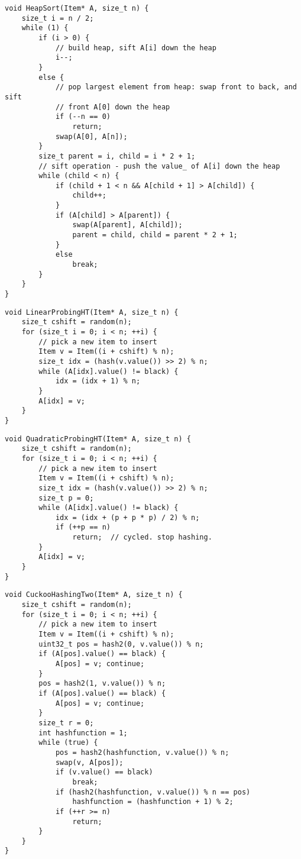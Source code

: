 \documentclass[a4paper,landscape,12pt,twoside,english]{scrartcl}
\begin{document}
\clearpage
\fontsize{15}{16}\selectfont
\begin{verbatim}
void HeapSort(Item* A, size_t n) {
    size_t i = n / 2;
    while (1) {
        if (i > 0) {
            // build heap, sift A[i] down the heap
            i--;
        }
        else {
            // pop largest element from heap: swap front to back, and sift
            // front A[0] down the heap
            if (--n == 0)
                return;
            swap(A[0], A[n]);
        }
        size_t parent = i, child = i * 2 + 1;
        // sift operation - push the value_ of A[i] down the heap
        while (child < n) {
            if (child + 1 < n && A[child + 1] > A[child]) {
                child++;
            }
            if (A[child] > A[parent]) {
                swap(A[parent], A[child]);
                parent = child, child = parent * 2 + 1;
            }
            else
                break;
        }
    }
}
\end{verbatim}

\clearpage
\fontsize{16}{17.5}\selectfont
\begin{verbatim}
void LinearProbingHT(Item* A, size_t n) {
    size_t cshift = random(n);
    for (size_t i = 0; i < n; ++i) {
        // pick a new item to insert
        Item v = Item((i + cshift) % n);
        size_t idx = (hash(v.value()) >> 2) % n;
        while (A[idx].value() != black) {
            idx = (idx + 1) % n;
        }
        A[idx] = v;
    }
}
\end{verbatim}
\begin{verbatim}
void QuadraticProbingHT(Item* A, size_t n) {
    size_t cshift = random(n);
    for (size_t i = 0; i < n; ++i) {
        // pick a new item to insert
        Item v = Item((i + cshift) % n);
        size_t idx = (hash(v.value()) >> 2) % n;
        size_t p = 0;
        while (A[idx].value() != black) {
            idx = (idx + (p + p * p) / 2) % n;
            if (++p == n)
                return;  // cycled. stop hashing.
        }
        A[idx] = v;
    }
}
\end{verbatim}

\clearpage
\fontsize{16}{18.1}\selectfont
\begin{verbatim}
void CuckooHashingTwo(Item* A, size_t n) {
    size_t cshift = random(n);
    for (size_t i = 0; i < n; ++i) {
        // pick a new item to insert
        Item v = Item((i + cshift) % n);
        uint32_t pos = hash2(0, v.value()) % n;
        if (A[pos].value() == black) {
            A[pos] = v; continue;
        }
        pos = hash2(1, v.value()) % n;
        if (A[pos].value() == black) {
            A[pos] = v; continue;
        }
        size_t r = 0;
        int hashfunction = 1;
        while (true) {
            pos = hash2(hashfunction, v.value()) % n;
            swap(v, A[pos]);
            if (v.value() == black)
                break;
            if (hash2(hashfunction, v.value()) % n == pos)
                hashfunction = (hashfunction + 1) % 2;
            if (++r >= n)
                return;
        }
    }
}
\end{verbatim}
\end{document}
